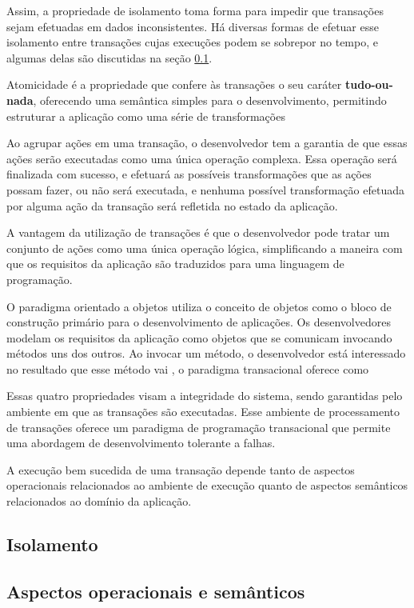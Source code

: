 \documentclass[11pt,twoside,a4paper]{book}
\begin{document}
Assim, a propriedade de isolamento toma forma para impedir que transações sejam efetuadas em dados inconsistentes. Há diversas formas de efetuar esse isolamento entre transações cujas execuções podem se sobrepor no tempo, e algumas delas são discutidas na seção \ref{subsec:isolamento}.

Atomicidade é a propriedade que confere às transações o seu caráter \textbf{tudo-ou-nada}, oferecendo uma semântica simples para o desenvolvimento, permitindo estruturar a aplicação como uma série de transformações

Ao agrupar ações em uma transação, o desenvolvedor tem a garantia de que essas ações serão executadas como uma única operação complexa. Essa operação será finalizada com sucesso, e efetuará as possíveis transformações que as ações possam fazer, ou não será executada, e nenhuma possível transformação efetuada por alguma ação da transação será refletida no estado da aplicação. 

A vantagem da utilização de transações é que o desenvolvedor pode tratar um conjunto de ações como uma única operação lógica, simplificando a maneira com que os requisitos da aplicação são traduzidos para uma linguagem de programação. 

O paradigma orientado a objetos utiliza o conceito de objetos como o bloco de construção primário para o desenvolvimento de aplicações. Os desenvolvedores modelam os requisitos da aplicação como objetos que se comunicam invocando métodos uns dos outros. Ao invocar um método, o desenvolvedor está interessado no resultado que esse método vai , o paradigma transacional oferece como 

Essas quatro propriedades visam a integridade do sistema, sendo garantidas pelo ambiente em que as transações são executadas. Esse ambiente de processamento de transações oferece um paradigma de programação transacional que permite uma abordagem de desenvolvimento tolerante a falhas.

A execução bem sucedida de uma transação depende tanto de aspectos operacionais relacionados ao ambiente de execução quanto de aspectos semânticos relacionados ao domínio da aplicação.

\subsection{Isolamento}
\label{subsec:isolamento}

\subsection{Aspectos operacionais e semânticos}
\label{subsec:aspectos_operacionais_e_semanticos}
\end{document}
